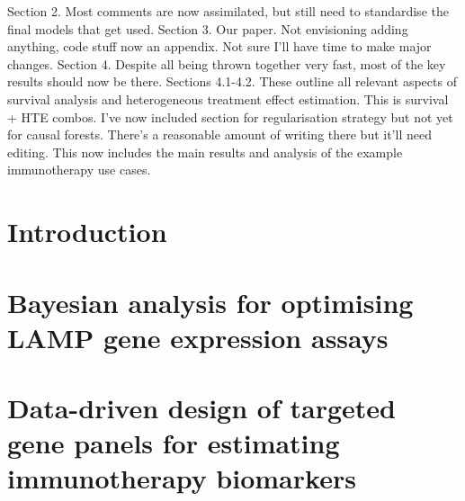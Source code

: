 \documentclass[12pt,twoside,openright]{report}
\theoremstyle{definition}
\begin{document}
{\begin{outline}
    \1 Section 2. Most comments are now assimilated, but still need to standardise the final models that get used.
    \1 Section 3. Our paper. Not envisioning adding anything, code stuff now an appendix. Not sure I'll have time to make major changes.
    \1 Section 4. Despite all being thrown together very fast, most of the key results should now be there.
        \2 Sections 4.1-4.2. These outline all relevant aspects of survival analysis and heterogeneous treatment effect estimation. 
        \2 This is survival + HTE combos. I've now included  section for regularisation strategy but not yet for causal forests. There's a reasonable amount of writing there but it'll need editing.
         This now includes the main results and analysis of the example immunotherapy use cases.
    
\end{outline}
}

\chapter{Introduction \label{chap:intro}}



\chapter{Bayesian analysis for optimising LAMP gene expression assays \label{chap:lamp_modelling}}


\chapter{Data-driven design of targeted gene panels for estimating immunotherapy biomarkers \label{chap:tmb_estimation}}

\end{document}
